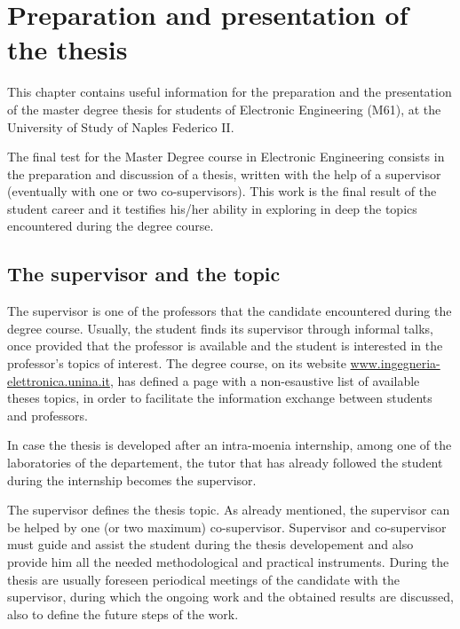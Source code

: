 %
%	 
%

\chapter{Preparation and presentation of the thesis}

This chapter contains useful information for the preparation and the presentation of the master degree thesis for students of Electronic Engineering (M61), at the University of Study of Naples Federico II.

The final test for the Master Degree course in Electronic Engineering consists in the preparation and discussion of a thesis, written with the help of a supervisor (eventually with one or two co-supervisors). This work is the final result of the student career and it testifies his/her ability in exploring in deep the topics encountered during the degree course.

\section{The supervisor and the topic}

The supervisor is one of the professors that the candidate encountered during the degree course. Usually, the student finds its supervisor through informal talks, once provided that the professor is available and the student is interested in the professor's topics of interest. The degree course, on its website \url{www.ingegneria-elettronica.unina.it}, has defined a page with a non-esaustive list of available theses topics, in order to facilitate the information exchange between students and professors.

In case the thesis is developed after an intra-moenia internship, among one of the laboratories of the departement, the tutor that has already followed the student during the internship becomes the supervisor.

The supervisor defines the thesis topic. As already mentioned, the supervisor can be helped by one (or two maximum) co-supervisor. Supervisor and co-supervisor must guide and assist the student during the thesis developement and also provide him all the needed methodological and practical instruments. During the thesis are usually foreseen periodical meetings of the candidate with the supervisor, during which the ongoing work and the obtained results are discussed, also to define the future steps of the work.



